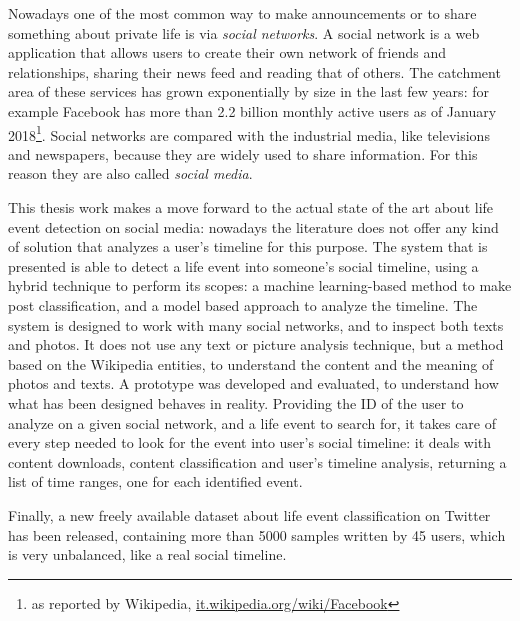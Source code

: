 Nowadays one of the most common way to make announcements or to share something about private life is via \emph{social networks}. A social network is a web application that allows users to create their own network of friends and relationships, sharing their news feed and reading that of others. The catchment area of these services has grown exponentially by size in the last few years: for example Facebook has more than 2.2 billion monthly active users as of January 2018\footnote{as reported by Wikipedia, \url{it.wikipedia.org/wiki/Facebook}}. Social networks are compared with the industrial media, like televisions and newspapers, because they are widely used to share information. For this reason they are also called \emph{social media}.

This thesis work makes a move forward to the actual state of the art about life event detection on social media: nowadays the literature does not offer any kind of solution that analyzes a user's timeline for this purpose. The system that is presented is able to detect a life event into someone's social timeline, using a hybrid technique to perform its scopes: a machine learning-based method to make post classification, and a model based approach to analyze the timeline. The system is designed to work with many social networks, and to inspect both texts and photos. It does not use any text or picture analysis technique, but a method based on the Wikipedia entities, to understand the content and the meaning of photos and texts. A prototype was developed and evaluated, to understand how what has been designed behaves in reality. Providing the ID of the user to analyze on a given social network, and a life event to search for, it takes care of every step needed to look for the event into user's social timeline: it deals with content downloads, content classification and user's timeline analysis, returning a list of time ranges, one for each identified event.

Finally, a new freely available dataset about life event classification on Twitter has been released, containing more than 5000 samples written by 45 users, which is very unbalanced, like a real social timeline.

